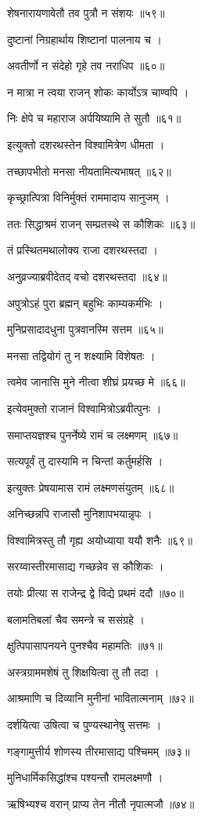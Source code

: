 शेषनारायणावेतौ तव पुत्रौ न संशयः ॥५९॥

दुष्टानां निग्रहार्थाय शिष्टानां पालनाय च ।

अवतीर्णो न संदेहो गृहे तव नराधिप ॥६०॥

न मात्रा न त्वया राजन् शोकः कार्योऽत्र चाण्वपि ।

निः क्षेपे च महाराज अर्पयिष्यामि ते सुतौ ॥६१॥

इत्युक्तो दशरथस्तेन विश्वामित्रेण धीमता ।

तच्छापभीतो मनसा नीयतामित्यभाषत् ॥६२॥

कृच्छ्रात्पित्रा विनिर्मुक्तं राममादाय सानुजम् ।

ततः सिद्धाश्रमं राजन् सम्प्रतस्थे स कौशिकः ॥६३॥

तं प्रस्थितमथालोक्य राजा दशरथस्तदा ।

अनुव्रज्याब्रवीदेतद् वचो दशरथस्तदा ॥६४॥

अपुत्रोऽहं पुरा ब्रह्मन् बहुभिः काम्यकर्मभिः ।

मुनिप्रसादादधुना पुत्रवानस्मि सत्तम ॥६५॥

मनसा तद्वियोगं तु न शक्ष्यामि विशेषतः ।

त्वमेव जानासि मुने नीत्वा शीघ्रं प्रयच्छ मे ॥६६॥

इत्येवमुक्तो राजानं विश्वामित्रोऽब्रवीत्पुनः ।

समाप्तयज्ञश्च पुनर्नेष्ये रामं च लक्ष्मणम् ॥६७॥

सत्यपूर्वं तु दास्यामि न चिन्तां कर्तुमर्हसि ।

इत्युक्तः प्रेषयामास रामं लक्ष्मणसंयुतम् ॥६८॥

अनिच्छन्नपि राजासौ मुनिशापभयान्नृपः ।

विश्वामित्रस्तु तौ गृह्य अयोध्याया ययौ शनैः ॥६९॥

सरय्वास्तीरमासाद्य गच्छन्नेव स कौशिकः ।

तयोः प्रीत्या स राजेन्द्र द्वे विद्ये प्रथमं ददौ ॥७०॥

बलामतिबलां चैव समन्त्रे च ससंग्रहे ।

क्षुत्पिपासापनयने पुनश्चैव महामतिः ॥७१॥

अस्त्रग्राममशेषं तु शिक्षयित्वा तु तौ तदा ।

आश्रमाणि च दिव्यानि मुनीनां भावितात्मनाम् ॥७२॥

दर्शयित्वा उषित्वा च पुण्यस्थानेषु सत्तमः ।

गङ्गामुत्तीर्य शोणस्य तीरमासाद्य पश्चिमम् ॥७३॥

मुनिधार्मिकसिद्धांश्च पश्यन्तौ रामलक्ष्मणौ ।

ऋषिभ्यश्च वरान् प्राप्य तेन नीतौ नृपात्मजौ ॥७४॥

